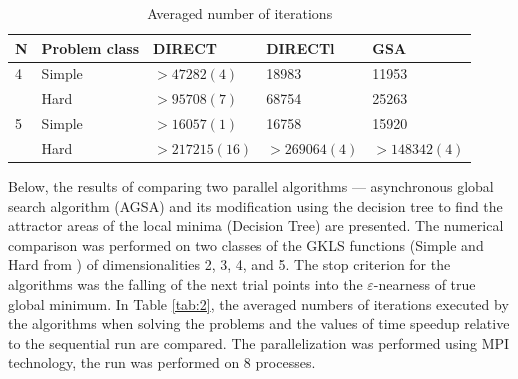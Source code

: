 \documentclass{svproc}
\begin{document}
\begin{table}[!ht]
    \caption{Averaged number of iterations}
    \label{tab:1}
    \centering
    \begin{tabular}{|l|l|l|l|l|}
    \hline
        N & Problem class & DIRECT & DIRECTl & GSA  \\ \hline
        4 & Simple & $>47282 (4)$ & 18983 & 11953  \\ \hline
        ~ & Hard & $>95708 (7)$ & 68754 & 25263  \\ \hline
        5 & Simple & $>16057 (1)$ & 16758 & 15920  \\ \hline
        ~ & Hard & $>217215 (16)$ & $>269064 (4)$ & $>148342 (4)$  \\ \hline
    \end{tabular}
\end{table}




Below, the results of comparing two parallel algorithms --- asynchronous global search algorithm  (AGSA) and its modification using the decision tree to find the attractor areas of the local minima  (Decision Tree) are presented. The numerical comparison was performed on two classes of the GKLS  functions (Simple and Hard from \cite{Sergeyev2006}) of dimensionalities 2, 3, 4, and 5. The stop  criterion for the algorithms was the falling of the next trial points into the $\varepsilon$-nearness of  true global minimum.  In Table \ref{tab:2}, the averaged numbers of iterations executed by the algorithms when solving the  problems and the values of time speedup relative to the sequential run are compared. The parallelization was performed using MPI technology, the run was performed on 8 processes.
\end{document}
